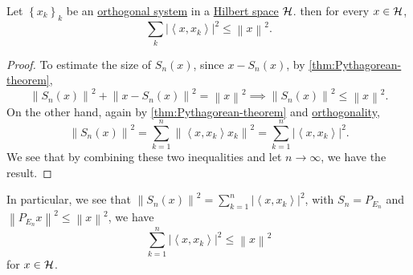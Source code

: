 \begin{theorem}\label{thm:Bessel-ineq}
	Let \(\left\{ x_k \right\} _k\) be an \hyperref[def:orthogonal-system]{orthogonal system} in a \hyperref[def:Hilbert-space]{Hilbert space} \(\mathcal{\MakeUppercase{h}} \). then for every \(x\in \mathcal{\MakeUppercase{h}} \),
	\[
		\sum_{k} \left\vert \left\langle x, x_{k}  \right\rangle  \right\vert ^{2} \leq \left\lVert x\right\rVert ^{2} .
	\]
\end{theorem}
\begin{proof}
	To estimate the size of \(S_n(x)\), since \(x - S_n(x)\), by \autoref{thm:Pythagorean-theorem},
	\[
		\left\lVert S_n(x)\right\rVert ^{2} + \left\lVert x - S_n (x)\right\rVert ^{2} = \left\lVert x\right\rVert ^{2} \implies \left\lVert S_{n} (x)\right\rVert ^{2} \leq \left\lVert x\right\rVert ^{2}.
	\]
	On the other hand, again by \autoref{thm:Pythagorean-theorem} and \hyperref[def:orthogonal]{orthogonality},
	\[
		\left\lVert S_{n} (x)\right\rVert ^{2} = \sum_{k=1} ^n \left\lVert \left\langle x, x_k \right\rangle x_k \right\rVert ^{2} = \sum_{k=1} ^n \left\vert \left\langle x, x_k \right\rangle  \right\vert ^{2} .
	\]
	We see that by combining these two inequalities and let \(n\to \infty \), we have the result.
\end{proof}
\begin{remark}
	In particular, we see that \(\left\lVert S_n (x)\right\rVert ^{2} = \sum_{k=1}^{n} \left\vert \left\langle x, x_{k}  \right\rangle \right\vert ^{2}\), with \(S_n = P_{E_n}\) and \(\left\lVert P_{E_n} x \right\rVert^{2} \leq \left\lVert x\right\rVert ^{2}\), we have
	\[
		\sum_{k=1}^{n} \left\vert \left\langle x, x_{k}  \right\rangle  \right\vert ^{2} \leq \left\lVert x\right\rVert ^{2}
	\]
	for \(x\in \mathcal{\MakeUppercase{h}} \).
\end{remark}

